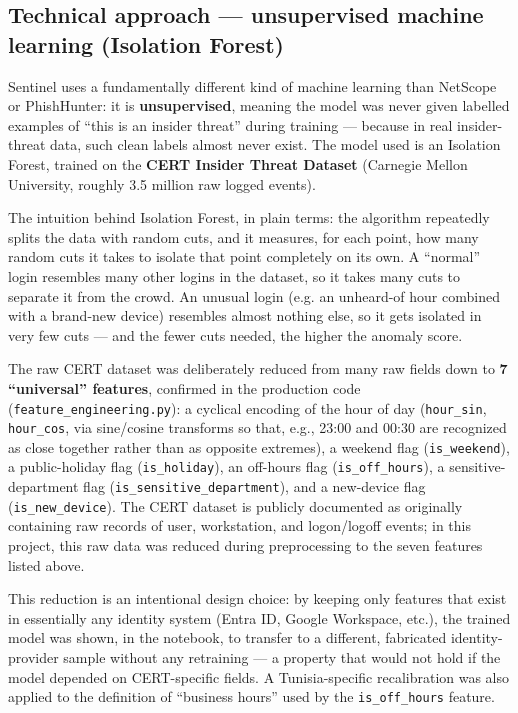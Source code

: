 \documentclass[12pt,a4paper]{report}
\begin{document}
\subsection*{Technical approach --- unsupervised machine learning (Isolation Forest)}
Sentinel uses a fundamentally different kind of machine learning than NetScope or PhishHunter: it is \textbf{unsupervised}, meaning the model was never given labelled examples of ``this is an insider threat'' during training --- because in real insider-threat data, such clean labels almost never exist. The model used is an Isolation Forest, trained on the \textbf{CERT Insider Threat Dataset} (Carnegie Mellon University, roughly 3.5 million raw logged events).

The intuition behind Isolation Forest, in plain terms: the algorithm repeatedly splits the data with random cuts, and it measures, for each point, how many random cuts it takes to isolate that point completely on its own. A ``normal'' login resembles many other logins in the dataset, so it takes many cuts to separate it from the crowd. An unusual login (e.g. an unheard-of hour combined with a brand-new device) resembles almost nothing else, so it gets isolated in very few cuts --- and the fewer cuts needed, the higher the anomaly score.

The raw CERT dataset was deliberately reduced from many raw fields down to \textbf{7 ``universal'' features}, confirmed in the production code (\texttt{feature\_engineering.py}): a cyclical encoding of the hour of day (\texttt{hour\_sin}, \texttt{hour\_cos}, via sine/cosine transforms so that, e.g., 23:00 and 00:30 are recognized as close together rather than as opposite extremes), a weekend flag (\texttt{is\_weekend}), a public-holiday flag (\texttt{is\_holiday}), an off-hours flag (\texttt{is\_off\_hours}), a sensitive-department flag (\texttt{is\_sensitive\_department}), and a new-device flag (\texttt{is\_new\_device}). The CERT dataset is publicly documented as originally containing raw records of user, workstation, and logon/logoff events; in this project, this raw data was reduced during preprocessing to the seven features listed above.

This reduction is an intentional design choice: by keeping only features that exist in essentially any identity system (Entra ID, Google Workspace, etc.), the trained model was shown, in the notebook, to transfer to a different, fabricated identity-provider sample without any retraining --- a property that would not hold if the model depended on CERT-specific fields. A Tunisia-specific recalibration was also applied to the definition of ``business hours'' used by the \texttt{is\_off\_hours} feature.
\end{document}
